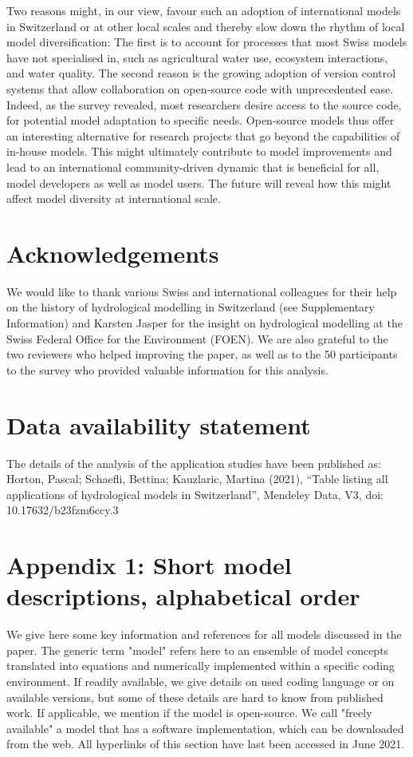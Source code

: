 \documentclass[10pt,a4paper]{article}
\begin{document}
Two reasons might, in our view, favour such an adoption of international models in Switzerland or at other local scales and thereby slow down the rhythm of local model diversification: The first is to account for processes that most Swiss models have not specialised in, such as agricultural water use, ecosystem interactions, and water quality. The second reason is the growing adoption of version control systems that allow collaboration on open-source code with unprecedented ease. Indeed, as the survey revealed, most researchers desire access to the source code, for potential model adaptation to specific needs. Open-source models thus offer an interesting alternative for research projects that go beyond the capabilities of in-house models. This might ultimately contribute to model improvements and lead to an international community-driven dynamic that is beneficial for all, model developers as well as model users. The future will reveal how this might affect model diversity at international scale. 


\section*{Acknowledgements}

We would like to thank various Swiss and international colleagues for their help on the history of hydrological modelling in Switzerland (see Supplementary Information) and Karsten Jasper for the insight on hydrological modelling at the Swiss Federal Office for the Environment (FOEN). We are also grateful to the two reviewers who helped improving the paper, as well as to the 50 participants to the survey who provided valuable information for this analysis.

\section*{Data availability statement}
The details of the analysis of the application studies have been published as: Horton, Pascal; Schaefli, Bettina; Kauzlaric, Martina (2021), “Table listing all applications of hydrological models in Switzerland”, Mendeley Data, V3, doi: 10.17632/b23fzm6ccy.3

\section*{Appendix 1: Short model descriptions, alphabetical order}
\label{appendix:1}

We give here some key information and references for all models discussed in the paper. The generic term "model" refers here to an ensemble of model concepts translated into equations and numerically implemented within a specific coding environment. If readily available, we give details on used coding language or on available versions, but some of these details are hard to know from published work. If applicable, we mention if the model is open-source. We call "freely available" a model that has a software implementation, which can be downloaded from the web. All hyperlinks of this section have last been accessed in June 2021.
\end{document}
